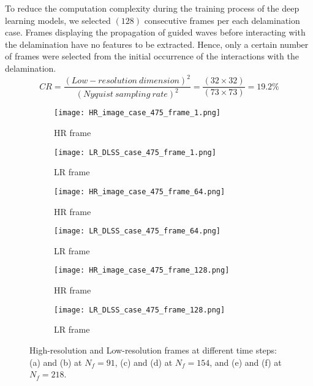 To reduce the computation complexity during the training process of the deep learning models, we selected \((128)\) consecutive frames per each delamination case.
Frames displaying the propagation of guided waves before interacting with the delamination have no features to be extracted. 
Hence, only a certain number of frames were selected from the initial occurrence of the interactions with the delamination.
\begin{equation}
	CR = \frac{(Low-resolution\ dimension)^2}{(Nyquist\ sampling\ rate)^2} = \frac{(32\times32)}{(73\times73)}=19.2\%
	\label{CR}
\end{equation}
\begin{figure} [!ht]
	\centering
	\begin{subfigure}[b]{.48\textwidth}
		\centering
	\texttt{[image: HR\_image\_case\_475\_frame\_1.png]}
		\caption{HR frame}
		\label{fig:SR_1}
	\end{subfigure}
	\hfill
	\begin{subfigure}[b]{.48\textwidth}
		\centering
		\texttt{[image: LR\_DLSS\_case\_475\_frame\_1.png]}
		\caption{LR frame}
		\label{fig:LR_1}	
	\end{subfigure}
	\hfill
		\begin{subfigure}[b]{.48\textwidth}
		\centering
		\texttt{[image: HR\_image\_case\_475\_frame\_64.png]}
		\caption{HR frame}
		\label{fig:SR_2}
	\end{subfigure}
	\hfill
	\begin{subfigure}[b]{.48\textwidth}
		\centering
		\texttt{[image: LR\_DLSS\_case\_475\_frame\_64.png]}
		\caption{LR frame}
		\label{fig:LR_2}	
	\end{subfigure}
	\hfill
		\begin{subfigure}[b]{.48\textwidth}
		\centering
		\texttt{[image: HR\_image\_case\_475\_frame\_128.png]}
		\caption{HR frame}
		\label{fig:SR_3}
	\end{subfigure}
	\hfill
	\begin{subfigure}[b]{.48\textwidth}
		\centering
		\texttt{[image: LR\_DLSS\_case\_475\_frame\_128.png]}
		\caption{LR frame}
		\label{fig:LR_3}	
	\end{subfigure}
	\caption{High-resolution and Low-resolution frames at different time steps: (a) and (b) at $N_f=91$, (c) and (d) at $N_f=154$, and (e) and (f) at $N_f=218$.}
	\label{fig:SR_LR}
\end{figure}
\newpage